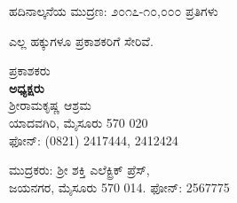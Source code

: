 \thispagestyle{empty}

{\fontsize{10}{12}\selectfont

\begin{flushleft}
\end{flushleft}

\vskip 1cm

\begin{flushleft}
ಹದಿನಾಲ್ಕನೆಯ ಮುದ್ರಣ: ೨೦೧೭-೧೦,೦೦೦ ಪ್ರತಿಗಳು 
\end{flushleft}

\vskip 2cm

\begin{flushleft}
 ಎಲ್ಲ ಹಕ್ಕುಗಳೂ ಪ್ರಕಾಶಕರಿಗೆ ಸೇರಿವೆ.
\end{flushleft}

\vskip 1cm

\begin{flushleft}
ಪ್ರಕಾಶಕರು\\\textbf{ಅಧ್ಯಕ್ಷರು}\\ಶ‍್ರೀರಾಮಕೃಷ್ಣ ಆಶ್ರಮ\\ಯಾದವಗಿರಿ, ಮೈಸೂರು 570 020\\ಫೋನ್​: (0821) 2417444, 2412424
\end{flushleft}

\vfill

\begin{flushleft}
ಮುದ್ರಕರು: ಶ‍್ರೀ ಶಕ್ತಿ ಎಲೆಕ್ಟ್ರಿಕ್ ಪ್ರೆಸ್,\\ಜಯನಗರ, ಮೈಸೂರು 570 014. ಫೋನ್​: 2567775
\end{flushleft}

}

